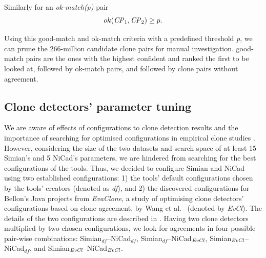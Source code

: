 \documentclass{sig-alternate-05-2015}
\newcommand{\squeezeup}{\vspace{-0.5mm}}
\begin{document}
Similarly for an \textit{ok-match(p)} pair
\begin{equation}
ok(\textrm{\textit{CP}}_1,\textrm{\textit{CP}}_2) \geq p.
\end{equation}

Using this good-match and ok-match criteria with a predefined threshold \textit{p}, we can prune the 266-million candidate clone pairs for manual investigation. good-match pairs are the ones with the highest confident and ranked the first to be looked at, followed by ok-match pairs, and followed by clone pairs without agreement.

\subsection{Clone detectors' parameter tuning}
We are aware of effects of configurations to clone detection results and the importance of searching for optimised configurations in empirical clone studies \cite{Wang2014,cr2016ssbse,Ragkhitwetsagul2016,Svajlenko2014}. However, considering the size of the two datasets and search space of at least 15 Simian's and 5 NiCad's parameters, we are hindered from searching for the best configurations of the tools. Thus, we decided to configure Simian and NiCad using two established configurations: 1) the tools' default configurations chosen by the tools' creators (denoted as \textit{df}), and 2) the discovered configurations for Bellon's Java projects from \textit{EvaClone}, a study of optimising clone detectors' configurations based on clone agreement, by Wang et al.~\cite{Wang2013} (denoted by \textit{EvCl}). The details of the two configurations are described in . Having two clone detectors multiplied by two chosen configurations, we look for agreements in four possible pair-wise combinations: Simian$_{df}$--NiCad$_{df}$, Simian$_{df}$--NiCad$_{\textrm{\textit{EvCl}}}$, Simian$_{\textrm{\textit{EvCl}}}$--NiCad$_{df}$, and Simian$_{\textrm{\textit{EvCl}}}$--NiCad$_{\textrm{\textit{EvCl}}}$.
\end{document}
